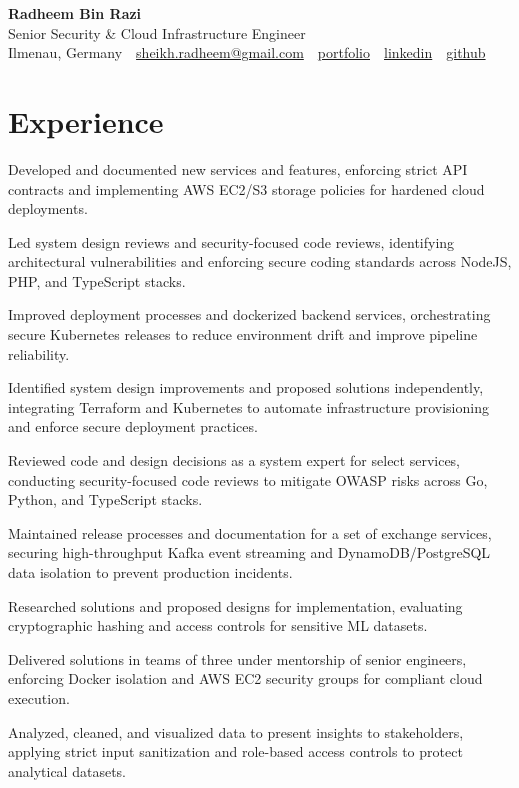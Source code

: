 \documentclass[11pt,a4paper]{resume}
\makeatletter
\newcommand{\Portfolio}{https://radheem.github.io/my-cv}
\newcommand{\PortfolioText}{portfolio}
\newcommand{\GitHub}{https://github.com/radheem}
\newcommand{\LinkedIn}{https://www.linkedin.com/in/radheem-razi}
\newcommand{\Email}{sheikh.radheem@gmail.com}
\makeatother
\begin{document}
\begin{center}
  {\huge\bfseries Radheem Bin Razi}\\[3pt]
  {\large Senior Security \& Cloud Infrastructure Engineer}\\[6pt]
  \small
  Ilmenau, Germany \,\textbar\,
  \href{mailto:\Email}{\Email} \,\textbar\,
  \href{\Portfolio}{\PortfolioText} \,\textbar\,
  \href{\LinkedIn}{linkedin} \,\textbar\,
  \href{\GitHub}{github}
\end{center}
\vspace{2pt}

\section{Experience}

\bullets
  \item Developed and documented new services and features, enforcing strict API contracts and implementing AWS EC2/S3 storage policies for hardened cloud deployments.
  \item Led system design reviews and security-focused code reviews, identifying architectural vulnerabilities and enforcing secure coding standards across NodeJS, PHP, and TypeScript stacks.
  \item Improved deployment processes and dockerized backend services, orchestrating secure Kubernetes releases to reduce environment drift and improve pipeline reliability.
\bulletsend
\vspace{3pt}
\bullets
  \item Identified system design improvements and proposed solutions independently, integrating Terraform and Kubernetes to automate infrastructure provisioning and enforce secure deployment practices.
  \item Reviewed code and design decisions as a system expert for select services, conducting security-focused code reviews to mitigate OWASP risks across Go, Python, and TypeScript stacks.
  \item Maintained release processes and documentation for a set of exchange services, securing high-throughput Kafka event streaming and DynamoDB/PostgreSQL data isolation to prevent production incidents.
\bulletsend
\vspace{3pt}
\bullets
  \item Researched solutions and proposed designs for implementation, evaluating cryptographic hashing and access controls for sensitive ML datasets.
  \item Delivered solutions in teams of three under mentorship of senior engineers, enforcing Docker isolation and AWS EC2 security groups for compliant cloud execution.
  \item Analyzed, cleaned, and visualized data to present insights to stakeholders, applying strict input sanitization and role-based access controls to protect analytical datasets.
\bulletsend
\vspace{3pt}
\end{document}

